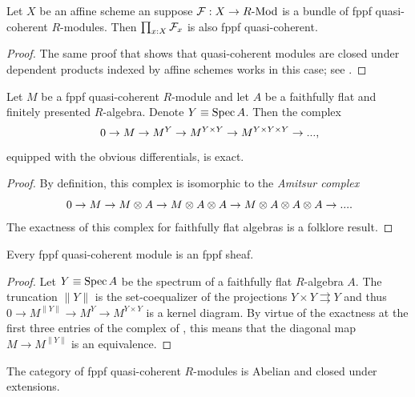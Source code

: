 \begin{lemma}
  \label{fppf-qc-closed-under-dependent-prod}
  Let $X$ be an affine scheme an suppose $\mathcal{F} : X \to R\text{-}\mathrm{Mod}$ is a bundle of fppf quasi-coherent $R$-modules.
  Then $\prod_{x:X}\mathcal{F}_x$ is also fppf quasi-coherent.
\end{lemma}

\begin{proof}
  The same proof that shows that quasi-coherent modules are closed under dependent products indexed by affine schemes works in this case; see .
\end{proof}

\begin{lemma}
  \label{Amitsur-exactness}
  Let $M$ be a fppf quasi-coherent $R$-module and let $A$ be a faithfully flat and finitely presented $R$-algebra.
  Denote $Y \equiv \operatorname{Spec} A$.
  Then the complex
  \[
    0 \to M \to M^Y \to M^{Y \times Y} \to M^{Y \times Y \times Y} \to ...\rlap{,}
  \]
  equipped with the obvious differentials, is exact.
\end{lemma}

\begin{proof}
  By definition, this complex is isomorphic to the \emph{Amitsur complex}
  \[
    0 \to M \to M \otimes A \to M \otimes A \otimes A \to M \otimes A \otimes A \otimes A \to ...\rlap{.}
  \]
  The exactness of this complex for faithfully flat algebras is a folklore result.
\end{proof}

\begin{corollary}
  Every fppf quasi-coherent module is an fppf sheaf.
\end{corollary}

\begin{proof}
  Let $Y \equiv \operatorname{Spec} A$ be the spectrum of a faithfully flat $R$-algebra $A$.
  The truncation $\|Y\|$ is the set-coequalizer of the projections $Y \times Y \rightrightarrows Y$ and thus $0 \to M^{\|Y\|} \to M^Y \to M^{Y \times Y}$ is a kernel diagram.
  By virtue of the exactness at the first three entries of the complex of , this means that the diagonal map $M \to M^{\|Y\|}$ is an equivalence.
\end{proof}

\begin{proposition}
  The category of fppf quasi-coherent $R$-modules is Abelian and closed under extensions.
\end{proposition}

